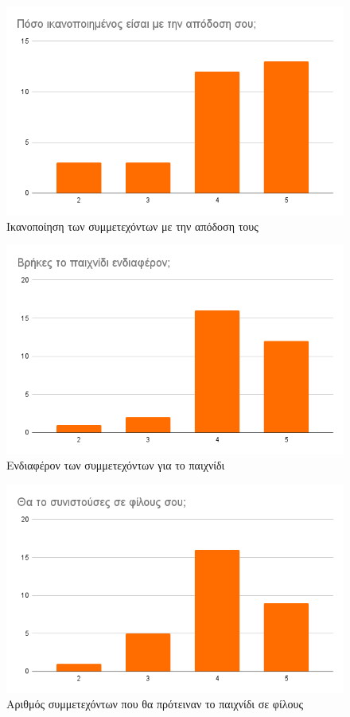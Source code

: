 \begin{figure}[H]
    \centering
    \includegraphics[width=0.7\linewidth]{sections/5/2/images/performance_satisfaction}
    \caption{Ικανοποίηση των συμμετεχόντων με την απόδοση τους}
    \label{fig:performance_satisfaction}
\end{figure}

\begin{figure}[H]
    \centering
    \includegraphics[width=0.7\linewidth]{sections/5/2/images/did_you_find_the_game_interesting}
    \caption{Ενδιαφέρον των συμμετεχόντων για το παιχνίδι}
    \label{fig:did_you_find_the_game_interesting}
\end{figure}

\begin{figure}[H]
    \centering
    \includegraphics[width=0.7\linewidth]{sections/5/2/images/would_you_reccomend_it_to_your_friends}
    \caption{Αριθμός συμμετεχόντων που θα πρότειναν το παιχνίδι σε φίλους}
    \label{fig:would_you_reccomend_it_to_your_friends}
\end{figure}

